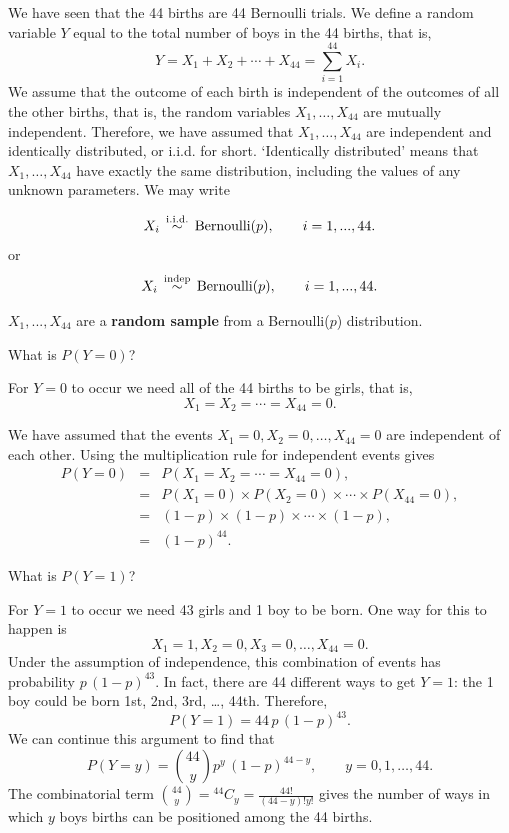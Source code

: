 \documentclass[
  british,
  11pt,
  openany, a4paper]{book}
\begin{document}
We have seen that the 44 births are 44 Bernoulli trials. We define a random variable \(Y\) equal to the total number of boys in the 44 births, that is,
\[ Y = X_1 + X_2 + \cdots + X_{44} = \sum_{i=1}^{44} X_i. \]
We assume that the outcome of each birth is independent of the outcomes of all the other births, that is, the random variables \(X_1, \ldots, X_{44}\) are mutually independent. Therefore, we have assumed that \(X_1, \ldots, X_{44}\) are independent and identically distributed, or i.i.d. for short. `Identically distributed' means that \(X_1, \ldots, X_{44}\) have exactly the same distribution, including the values of any unknown parameters. We may write

\[ X_i \,\stackrel{{\rm i.i.d.}}{\sim}\, \text{Bernoulli}(p), \qquad i=1, ... , 44. \]
or
\[ X_i \,\stackrel{{\rm indep}}{\sim}\, \text{Bernoulli}(p), \qquad i=1, ... , 44. \]

\(X_1, ... , X_{44}\) are a \textbf{random sample} from a Bernoulli(\(p\)) distribution.

What is \(P(Y=0)\)?

For \(Y=0\) to occur we need all of the 44 births to be girls, that is,
\[ X_1=X_2=\cdots=X_{44}=0.\]

We have assumed that the events \(X_1=0, X_2=0, \ldots, X_{44}=0\) are independent of each other. Using the multiplication rule for independent events gives
\begin{eqnarray*}
P(Y=0)&=&P(X_1=X_2=\cdots=X_{44}=0), \\
      &=&P(X_1=0) \times P(X_2=0) \times \cdots \times P(X_{44}=0), \\
      &=&(1-p) \times (1-p) \times \cdots \times (1-p), \\
      &=&(1-p)^{44}.
\end{eqnarray*}

What is \(P(Y=1)\)?

For \(Y=1\) to occur we need 43 girls and 1 boy to be born. One way for this to happen is
\[ X_1=1, X_2=0, X_3=0, \ldots, X_{44}=0. \]
Under the assumption of independence, this combination of events has probability \(p\,(1-p)^{43}\).
In fact, there are 44 different ways to get \(Y=1\): the 1 boy could be born 1st, 2nd, 3rd, \ldots, 44th.
Therefore,
\[ P(Y=1) = 44\,p\,(1-p)^{43}. \]
We can continue this argument to find that
\[ 
P(Y=y)={44 \choose y} 
p^y\,(1-p)^{44-y}, \qquad y=0,1,\ldots,44. 
\]
The combinatorial term \({44 \choose y}={}^{44}C_y=\frac{44!}{(44-y)!y!}\)
gives the number of ways in which \(y\) boys births can be positioned among the 44 births.
\end{document}
